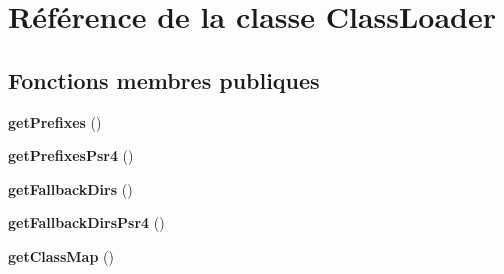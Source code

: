 \hypertarget{class_composer_1_1_autoload_1_1_class_loader}{}\section{Référence de la classe Class\+Loader}
\label{class_composer_1_1_autoload_1_1_class_loader}
\subsection*{Fonctions membres publiques}
\begin{DoxyCompactItemize}
\item 
{\bfseries get\+Prefixes} ()\hypertarget{class_composer_1_1_autoload_1_1_class_loader_a102069675f7a94f8917f44acc2390687}{}\label{class_composer_1_1_autoload_1_1_class_loader_a102069675f7a94f8917f44acc2390687}

\item 
{\bfseries get\+Prefixes\+Psr4} ()\hypertarget{class_composer_1_1_autoload_1_1_class_loader_aa51c60813356de68739dbc9047976ceb}{}\label{class_composer_1_1_autoload_1_1_class_loader_aa51c60813356de68739dbc9047976ceb}

\item 
{\bfseries get\+Fallback\+Dirs} ()\hypertarget{class_composer_1_1_autoload_1_1_class_loader_ae15bf208c8df574932ed0db749d5447b}{}\label{class_composer_1_1_autoload_1_1_class_loader_ae15bf208c8df574932ed0db749d5447b}

\item 
{\bfseries get\+Fallback\+Dirs\+Psr4} ()\hypertarget{class_composer_1_1_autoload_1_1_class_loader_a1f1f85b44a8d01987ad2b6cd78f268bd}{}\label{class_composer_1_1_autoload_1_1_class_loader_a1f1f85b44a8d01987ad2b6cd78f268bd}

\item 
{\bfseries get\+Class\+Map} ()\hypertarget{class_composer_1_1_autoload_1_1_class_loader_a7e9a9730c400820ee2b1c995cd5134fe}{}\label{class_composer_1_1_autoload_1_1_class_loader_a7e9a9730c400820ee2b1c995cd5134fe}


\end{DoxyCompactItemize}
